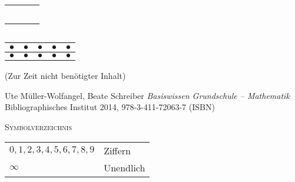 \documentclass[a4paper]{amsart}
\theoremstyle{definition}
\begin{document}
\begin{tabular}{|cc|}
   \hline
   $\phantom\bullet$&$\phantom\bullet$\\
   \hline
\end{tabular}
\begin{tabular}{|cc|}
\hline
$\phantom\bullet$&$\phantom\bullet$\\
\hline
\end{tabular}
\begin{tabular}{|c|c|c|c|c|}
\hline
$\bullet$ & $\bullet$ & $\bullet$ & $\bullet$ & $\bullet$\\
\hline
$\bullet$ & $\bullet$ & $\bullet$ & $\bullet$ & $\bullet$\\
\hline
\end{tabular}
 
\begin{backup}
   (Zur Zeit nicht benötigter Inhalt)
\end{backup}

\begin{thebibliography}{9}
      Ute Müller-Wolfangel, Beate Schreiber \emph{Basiswissen Grundschule – Mathematik}
      Bibliographisches Institut 2014, 978-3-411-72063-7 (ISBN)

\end{thebibliography}

\begin{large}
    \centerline{\textsc{Symbolverzeichnis}}
\end{large}
\bigskip

\renewcommand*{\arraystretch}{1}

\begin{tabular}{ll}
    $0,1,2,3,4,5,6,7,8,9$          & Ziffern\\
    $\infty$                       & Unendlich
\end{tabular}
\end{document}
